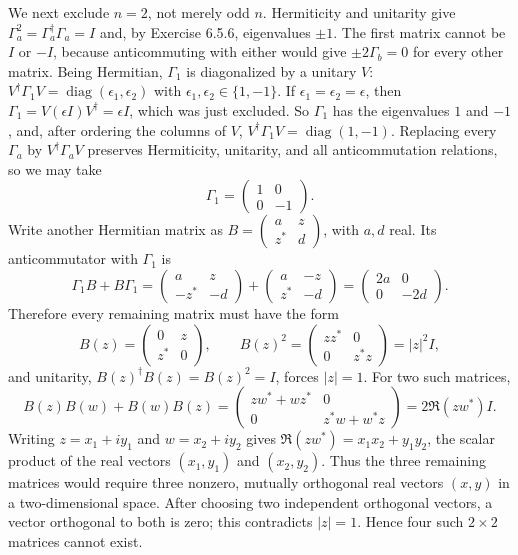 We next exclude $n=2$, not merely odd $n$. Hermiticity and unitarity give
$\Gamma_a^2=\Gamma_a^\dagger\Gamma_a=I$ and, by Exercise 6.5.6,
eigenvalues $\pm1$. The first matrix cannot be $I$
or $-I$, because anticommuting with either would give
$\pm2\Gamma_b=0$ for every other matrix. Being Hermitian, $\Gamma_1$ is
diagonalized by a unitary $V$:
$V^\dagger\Gamma_1V=\operatorname{diag}(\epsilon_1,\epsilon_2)$ with
$\epsilon_1,\epsilon_2\in\{1,-1\}$. If $\epsilon_1=\epsilon_2=\epsilon$,
then $\Gamma_1=V(\epsilon I)V^\dagger=\epsilon I$, which was just
excluded. So $\Gamma_1$ has the eigenvalues $1$ and $-1$, and, after
ordering the columns of $V$,
$V^\dagger\Gamma_1V=\operatorname{diag}(1,-1)$. Replacing every
$\Gamma_a$ by $V^\dagger\Gamma_aV$ preserves Hermiticity, unitarity,
and all anticommutation relations, so we may take
\[
\Gamma_1=\begin{pmatrix}1&0\\0&-1\end{pmatrix}.
\]
Write another Hermitian matrix as
$B=\begin{pmatrix}a&z\\z^*&d\end{pmatrix}$, with $a,d$ real.
Its anticommutator with $\Gamma_1$ is
\[
\Gamma_1B+B\Gamma_1
=\begin{pmatrix}a&z\\-z^*&-d\end{pmatrix}
+\begin{pmatrix}a&-z\\z^*&-d\end{pmatrix}
=\begin{pmatrix}2a&0\\0&-2d\end{pmatrix}.
\]
Therefore every remaining matrix must have the form
\[
B(z)=\begin{pmatrix}0&z\\z^*&0\end{pmatrix},\qquad
B(z)^2=\begin{pmatrix}zz^*&0\\0&z^*z\end{pmatrix}=|z|^2I,
\]
and unitarity, $B(z)^\dagger B(z)=B(z)^2=I$, forces $|z|=1$.
For two such matrices,
\[
B(z)B(w)+B(w)B(z)
=\begin{pmatrix}zw^*+wz^*&0\\0&z^*w+w^*z\end{pmatrix}
=2\Re(zw^*)I.
\]
Writing $z=x_1+iy_1$ and $w=x_2+iy_2$ gives
$\Re(zw^*)=x_1x_2+y_1y_2$, the scalar product of the real vectors
$(x_1,y_1)$ and $(x_2,y_2)$.
Thus the three remaining matrices would require three nonzero,
mutually orthogonal real vectors $(x,y)$ in a two-dimensional space.
After choosing two independent orthogonal vectors, a vector orthogonal
to both is zero; this contradicts $|z|=1$. Hence four such $2\times2$
matrices cannot exist.

